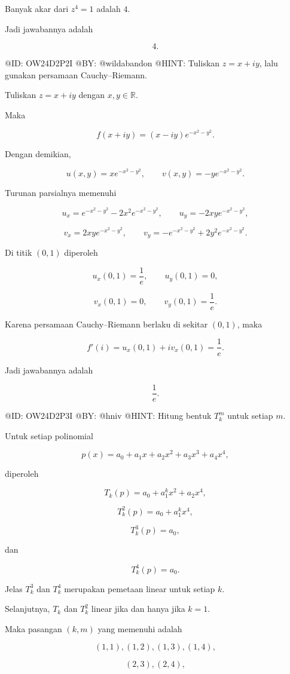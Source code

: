 Banyak akar dari $z^4=1$ adalah $4$.

Jadi jawabannya adalah

$$
\boxed{4.}
$$

@ID: OW24D2P2I
@BY: @wildabandon
@HINT: Tuliskan $z=x+iy$, lalu gunakan persamaan Cauchy--Riemann.

Tuliskan $z=x+iy$ dengan $x,y\in\mathbb R$.

Maka

$$
f(x+iy)
=(x-iy)e^{-x^2-y^2}.
$$

Dengan demikian,

$$
u(x,y)=xe^{-x^2-y^2},
\qquad
v(x,y)=-ye^{-x^2-y^2}.
$$

Turunan parsialnya memenuhi

$$
u_x=e^{-x^2-y^2}-2x^2e^{-x^2-y^2},
\qquad
u_y=-2xye^{-x^2-y^2},
$$

$$
v_x=2xye^{-x^2-y^2},
\qquad
v_y=-e^{-x^2-y^2}+2y^2e^{-x^2-y^2}.
$$

Di titik $(0,1)$ diperoleh

$$
u_x(0,1)=\frac1e,\qquad
u_y(0,1)=0,
$$

$$
v_x(0,1)=0,\qquad
v_y(0,1)=\frac1e.
$$

Karena persamaan Cauchy--Riemann berlaku di sekitar $(0,1)$, maka

$$
f'(i)
=u_x(0,1)+iv_x(0,1)
=\frac1e.
$$

Jadi jawabannya adalah

$$
\boxed{\frac1e.}
$$

@ID: OW24D2P3I
@BY: @hniv
@HINT: Hitung bentuk $T_k^m$ untuk setiap $m$.

Untuk setiap polinomial

$$
p(x)=a_0+a_1x+a_2x^2+a_3x^3+a_4x^4,
$$

diperoleh

$$
T_k(p)=a_0+a_1^kx^2+a_2x^4,
$$

$$
T_k^2(p)=a_0+a_1^kx^4,
$$

$$
T_k^3(p)=a_0,
$$

dan

$$
T_k^4(p)=a_0.
$$

Jelas $T_k^3$ dan $T_k^4$ merupakan pemetaan linear untuk setiap $k$.

Selanjutnya, $T_k$ dan $T_k^2$ linear jika dan hanya jika $k=1$.

Maka pasangan $(k,m)$ yang memenuhi adalah

$$
(1,1),(1,2),(1,3),(1,4),
$$

$$
(2,3),(2,4),
$$

